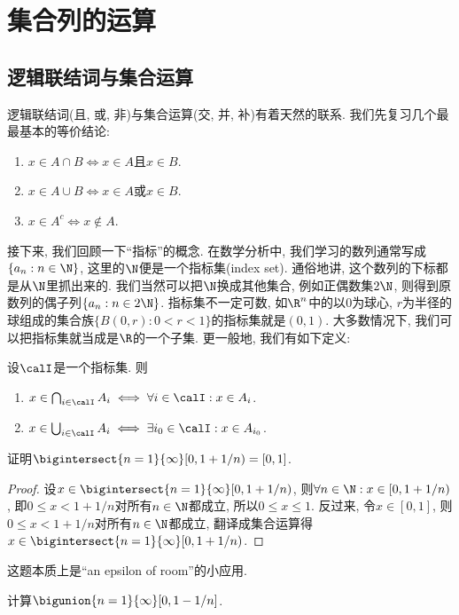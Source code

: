 
\section{集合列的运算}
\subsection{逻辑联结词与集合运算}
逻辑联结词(且, 或, 非)与集合运算(交, 并, 补)有着天然的联系. 我们先复习几个最最基本的等价结论:
\begin{enumerate}
    \item $x \in A \cap B \Longleftrightarrow x\in A$且$x \in B$. 
    \item $x \in A \cup B \Longleftrightarrow x\in A$或$x \in B$.
    \item $x \in A^c \Longleftrightarrow x \notin A$. 
\end{enumerate}

接下来, 我们回顾一下“指标”的概念. 在数学分析中, 我们学习的数列通常写成$\{a_n: n \in \N\}$, 这里的$\N$便是一个指标集(index set). 通俗地讲, 这个数列的下标都是从$\N$里抓出来的. 我们当然可以把$\N$换成其他集合, 例如正偶数集$2\N$, 则得到原数列的偶子列$\{a_n: n \in 2\N\}$. 指标集不一定可数, 
如$\R^n$中的以$0$为球心, $r$为半径的球组成的集合族$\{B(0,r): 0<r<1\}$的指标集就是$(0,1)$. 大多数情况下, 我们可以把指标集就当成是$\R$的一个子集. 更一般地, 我们有如下定义:

设$\calI$是一个指标集. 则
\begin{enumerate}
    \item $x\in \bigcap_{i\in \calI}A_i \iff \forall i \in \calI: x \in A_i $.
    \item $x\in \bigcup_{i\in \calI}A_i \iff \exists i_0 \in \calI: x \in A_{i_0} $.
\end{enumerate}
\begin{example}
    证明$\bigintersect{n=1}{\infty}[0, 1+1/n)=[0,1]$.
\end{example}
\begin{proof}
    设$x \in \bigintersect{n=1}{\infty}[0, 1+1/n)$, 则$\forall n \in \N: x \in [0, 1+1/n)$,
    即$0\leq x < 1+1/n$对所有$n \in \N$都成立, 所以$0\leq x \leq 1$. 
    反过来, 令$x \in [0,1]$, 则$0 \leq x < 1+1/n$对所有$n \in \N$都成立, 翻译成集合运算得
    $x \in \bigintersect{n=1}{\infty}[0, 1+1/n)$.
\end{proof}
\begin{remark}
    这题本质上是“an epsilon of room”的小应用.
\end{remark}
\begin{exercise}
    计算$\bigunion{n=1}{\infty}[0, 1-1/n]$.
\end{exercise}


